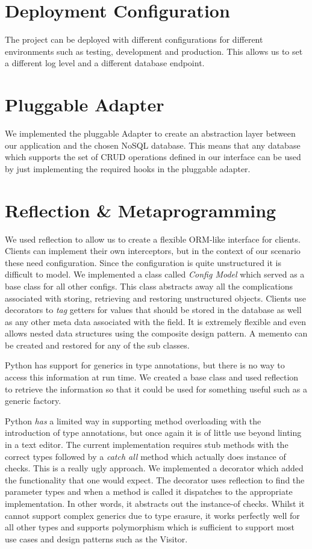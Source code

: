   \section{Deployment Configuration}
  The project can be deployed with different configurations for different environments such as
  testing, development and production. This allows us to set a different log level and a different
  database endpoint.

  \section{Pluggable Adapter}
  We implemented the pluggable Adapter to create an abstraction layer between our application and
  the chosen NoSQL database. This means that any database which supports the set of CRUD operations
  defined in our interface can be used by just implementing the required hooks in the pluggable
  adapter.

  \section{Reflection \& Metaprogramming}
  \label{added_value_reflection}
  We used reflection to allow us to create a flexible ORM-like interface for clients.
  Clients can implement their own interceptors, but in the context of our scenario these need
  configuration. Since the configuration is quite unstructured it is difficult to model.
  We implemented a class called \emph{Config Model} which served as a base class for all other configs.
  This class abstracts away all the complications associated with storing, retrieving and restoring
  unstructured objects. Clients use decorators to \emph{tag} getters for values that should be stored
  in the database as well as any other meta data associated with the field.
  It is extremely flexible and even allows nested data structures using the composite design
  pattern. A memento can be created and restored for any of the sub classes.

  Python has support for generics in type annotations, but there is no way to access this information
  at run time. We created a base class and used reflection to retrieve the information so that it
  could be used for something useful such as a generic factory.

  Python \emph{has} a limited way in supporting method overloading with the introduction of type
  annotations, but once again it is of little use beyond linting in a text editor.
  The current implementation requires stub methods with the correct types followed by a \emph{catch
  all} method which actually does instance of checks. This is a really ugly approach.
  We implemented a decorator which added the functionality that one would expect. The decorator
  uses reflection to find the parameter types and when a method is called it dispatches to the
  appropriate implementation. In other words, it abstracts out the instance-of checks.
  Whilst it cannot support complex generics due to type erasure, it works perfectly well
  for all other types and supports polymorphism which is sufficient to support most use cases
  and design patterns such as the Visitor.


